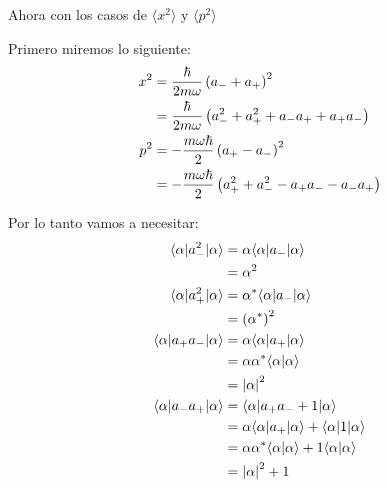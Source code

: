 \documentclass{report}
\begin{document}
Ahora con los casos de $\langle x^2 \rangle$ y $\langle p^2 \rangle$

Primero miremos lo siguiente:
\begin{align*}
  x^2 &= \frac{\hbar}{2m\omega} \left(a_{-} + a_{+}\right)^2\\
  &= \frac{\hbar}{2m\omega} \left(a_{-}^2 + a_{+}^2 + a_- a_+ + a_+a_-\right)\\
  p^2 &= - \frac{m\omega\hbar}{2}\left(a_{+} - a_{-}\right)^2\\
  &= - \frac{m\omega\hbar}{2}\left(a_{+}^2 + a_{-}^2 - a_+a_- - a_-a_+\right)
\end{align*}

Por lo tanto vamos a necesitar:
\begin{align*}
  \langle \alpha | a_-^2 | \alpha \rangle &= \alpha\langle \alpha | a_- | \alpha \rangle\\
  &= \alpha^2\\
  \langle \alpha | a_+^2 | \alpha \rangle &= \alpha^*\langle \alpha | a_- | \alpha \rangle\\
  &= \left(\alpha^*\right)^2\\
  \langle \alpha | a_+a_- | \alpha \rangle &= \alpha \langle \alpha | a_+ | \alpha \rangle\\
  &= \alpha\alpha^* \langle \alpha | \alpha \rangle\\
  &= \left|\alpha\right|^2\\
  \langle \alpha | a_-a_+ | \alpha \rangle &= \langle \alpha | a_+a_- + 1 | \alpha \rangle\\
  &= \alpha \langle \alpha | a_+ | \alpha \rangle + \langle \alpha | 1 | \alpha \rangle\\
  &= \alpha\alpha^* \langle \alpha | \alpha \rangle + 1 \langle \alpha | \alpha \rangle\\
  &= \left|\alpha\right|^2 + 1
\end{align*}
\end{document}

